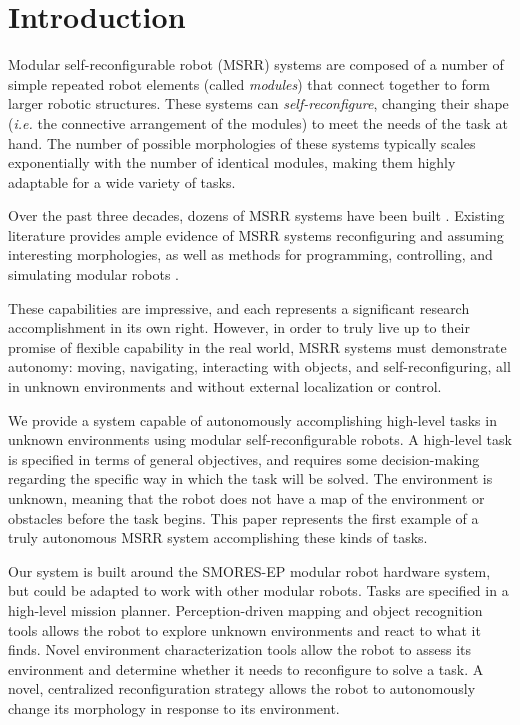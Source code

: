 \documentclass[conference]{IEEEtran}
\begin{document}
\section{Introduction} \label{sec:introduction}
%
Modular self-reconfigurable robot (MSRR) systems are composed of a number of simple repeated robot elements (called \emph{modules}) that connect together to form larger robotic structures. These systems can \emph{self-reconfigure}, changing their shape (\emph{i.e.} the connective arrangement of the modules) to meet the needs of the task at hand.
The number of possible morphologies of these systems typically scales exponentially with the number of identical modules, making them highly adaptable for a wide variety of tasks. 

Over the past three decades, dozens of MSRR systems have been built \cite{Yim2007a}. Existing literature provides ample evidence of MSRR systems reconfiguring and assuming interesting morphologies, as well as methods for programming, controlling, and simulating modular robots \cite{Yim2007,Jing2016,Yim1994}.

These capabilities are impressive, and each represents a significant research accomplishment in its own right. However, in order to truly live up to their promise of flexible capability in the real world, MSRR systems must demonstrate autonomy: moving, navigating, interacting with objects, and self-reconfiguring, all in unknown environments and without external localization or control. 

We provide a system capable of autonomously accomplishing high-level
tasks in unknown environments using modular self-reconfigurable
robots.  A high-level task is specified in terms
of general objectives, and requires some decision-making regarding the specific
way in which the task will be solved. The environment is unknown, meaning
that the robot does not have a map of the environment or obstacles before the
task begins. This paper represents the first example of a truly autonomous MSRR system accomplishing these kinds of tasks.

Our system is built around the SMORES-EP modular robot hardware system, but could be adapted to work with other modular robots. Tasks are specified in a high-level mission planner.  Perception-driven mapping and object recognition tools  allows the robot to explore unknown environments and react to what it finds. Novel environment characterization tools allow the robot to assess its environment and determine whether it needs to reconfigure to solve a task.  A novel, centralized reconfiguration strategy allows the robot to autonomously change its morphology in response to its environment.
\end{document}

